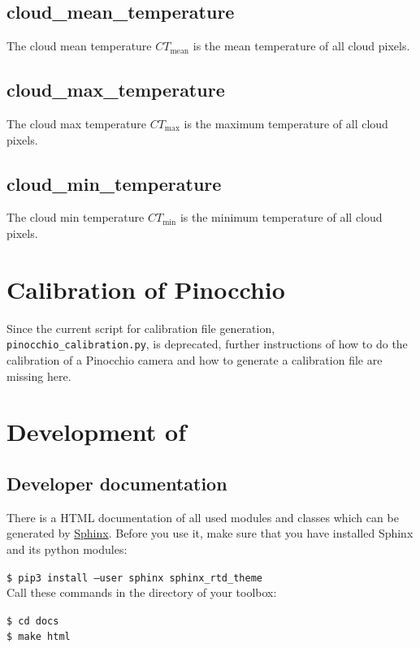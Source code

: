 \documentclass[11pt,a4paper]{article}
\begin{document}
\subsection{cloud\_mean\_temperature}
The cloud mean temperature $CT_\text{mean}$ is the mean temperature of all cloud pixels.

\subsection{cloud\_max\_temperature}
The cloud max temperature $CT_\text{max}$ is the maximum temperature of all cloud pixels.

\subsection{cloud\_min\_temperature}
The cloud min temperature $CT_\text{min}$ is the minimum temperature of all cloud pixels.

\section{Calibration of Pinocchio}
\label{sec:calibration}
Since the current script for calibration file generation, \texttt{pinocchio\_calibration.py}, is deprecated, further instructions of how to do the calibration of a Pinocchio camera and how to generate a calibration file are missing here.

\section{Development of \cloud}
\label{sec:development}

\subsection{Developer documentation}
There is a HTML documentation of all used modules and classes which can be generated by \href{http://www.sphinx-doc.org/en/stable/install.html}{Sphinx}. Before you use it, make sure that you have installed Sphinx and its python modules:

\texttt{\$ pip3 install --user sphinx sphinx\_rtd\_theme}\\

Call these commands in the directory of your \cloud toolbox:

\texttt{\$ cd docs}\\
\texttt{\$ make html}\\
\end{document}
